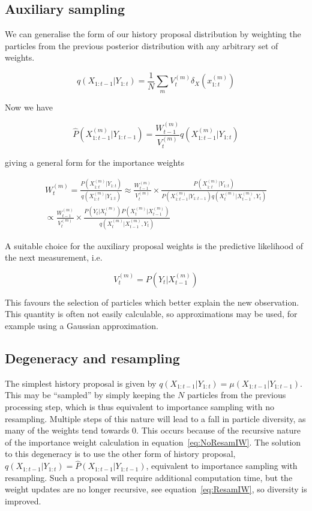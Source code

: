 \subsection{Auxiliary sampling}

We can generalise the form of our history proposal distribution by weighting the particles from the previous posterior distribution with any arbitrary set of weights.

\begin{equation}
q(X_{1:t-1}|Y_{1:t}) = \frac{1}{N} \sum_m {V_t^{(m)} \delta_{X} (x_{1:t}^{(m)})}
\label{eq:AuxiliarySamplingProposal}
\end{equation}

Now we have

\begin{equation}
\hat{P}(X_{1:t-1}^{(m)}|Y_{1:t-1}) = \frac{W_{t-1}^{(m)}}{V_t^{(m)}} q(X_{1:t-1}^{(m)}|Y_{1:t})
\label{eq:}
\end{equation}

giving a general form for the importance weights

\begin{multline}
W_t^{(m)} = \frac{P(X_{1:t}^{(m)}|Y_{1:t})}{q(X_{1:t}^{(m)}|Y_{1:t})}
\approx \frac{W_{t-1}^{(m)}}{V_{t}^{(m)}} \times \frac{P(X_{1:t}^{(m)}|Y_{1:t})}{P(X_{1:t-1}^{(m)}|Y_{1:t-1}) q(X_{t}^{(m)}|X_{t-1}^{(m)}, Y_{t})}\\
\propto \frac{W_{t-1}^{(m)}}{V_{t}^{(m)}} \times \frac{ P(Y_t|X_t^{(m)})P(X_t^{(m)}|X_{t-1}^{(m)})}{q(X_t^{(m)}|X_{t-1}^{(m)}, Y_t)}
\label{eq:AuxiliaryIW}
\end{multline}

A suitable choice for the auxiliary proposal weights is the predictive likelihood of the next measurement, i.e.

\begin{equation}
V_t^{(m)} = P(Y_t|X_{t-1}^{(m)})
\label{eq:}
\end{equation}

This favours the selection of particles which better explain the new observation. This quantity is often not easily calculable, so approximations may be used, for example using a Gaussian approximation.



\subsection{Degeneracy and resampling}
The simplest history proposal is given by $q(X_{1:t-1}|Y_{1:t}) = \mu(X_{1:t-1}|Y_{1:t-1})$. This may be ``sampled'' by simply keeping the $N$ particles from the previous processing step, which is thus equivalent to importance sampling with no resampling. Multiple steps of this nature will lead to a fall in particle diversity, as many of the weights tend towards 0. This occurs because of the recursive nature of the importance weight calculation in equation~\ref{eq:NoResamIW}. The solution to this degeneracy is to use the other form of history proposal, $q(X_{1:t-1}|Y_{1:t}) = \hat{P}(X_{1:t-1}|Y_{1:t-1})$, equivalent to importance sampling with resampling. Such a proposal will require additional computation time, but the weight updates are no longer recursive, see equation~\ref{eq:ResamIW}, so diversity is improved.

